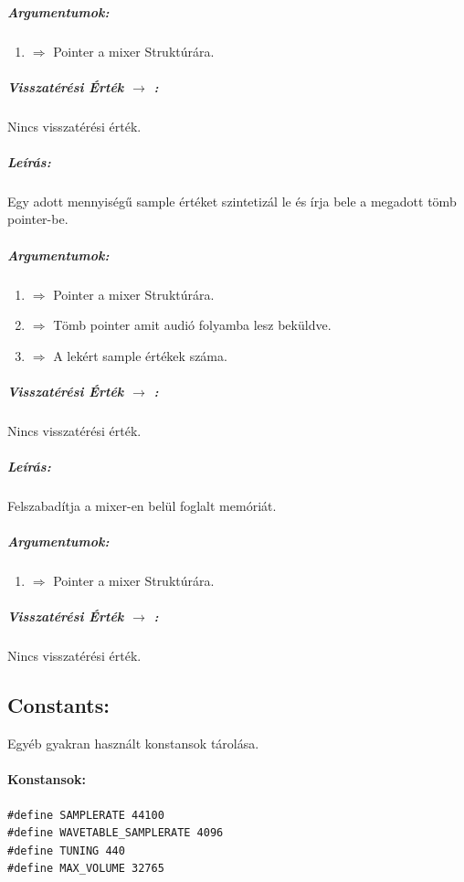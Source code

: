 \documentclass{article}
\begin{document}
\subparagraph{Argumentumok:}
\begin{enumerate}
    \item {} \(\Rightarrow\) Pointer a mixer Struktúrára.
\end{enumerate}

\subparagraph{Visszatérési Érték \(\rightarrow\) :}
Nincs visszatérési érték.
\chline


\subparagraph{Leírás:}
Egy adott mennyiségű sample értéket szintetizál le és írja bele
a megadott tömb pointer-be.

\subparagraph{Argumentumok:}
\begin{enumerate}
    \item {} \(\Rightarrow\) Pointer a mixer Struktúrára.
    \item {} \(\Rightarrow\) Tömb pointer amit 
        audió folyamba lesz beküldve.
    \item {} \(\Rightarrow\) A lekért sample értékek 
        száma.
\end{enumerate}

\subparagraph{Visszatérési Érték \(\rightarrow\) :}
Nincs visszatérési érték.
\chline


\subparagraph{Leírás:}
Felszabadítja a mixer-en belül foglalt memóriát.

\subparagraph{Argumentumok:}
\begin{enumerate}
    \item {} \(\Rightarrow\) Pointer a mixer Struktúrára.
\end{enumerate}

\subparagraph{Visszatérési Érték \(\rightarrow\) :}
Nincs visszatérési érték.
\chline

\subsection{Constants:}
Egyéb gyakran használt konstansok tárolása.

\paragraph{Konstansok:}

\begin{lstlisting}[caption={Általános konstansok}]
#define SAMPLERATE 44100
#define WAVETABLE_SAMPLERATE 4096
#define TUNING 440
#define MAX_VOLUME 32765
\end{lstlisting}
\end{document}
